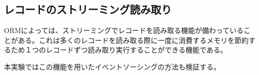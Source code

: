 \documentclass[../../../main]{subfiles}
\begin{document}
    \subsection{レコードのストリーミング読み取り}\label{subsec:phraseology-record_streaming_read}

    ORMによっては、ストリーミングでレコードを読み取る機能が備わっていることがある。これは多くのレコードを読み取る際に一度に消費するメモリを節約するため１つのレコードずつ読み取り実行することができる機能である。

    本実験ではこの機能を用いたイベントソーシングの方法も検証する。
\end{document}
